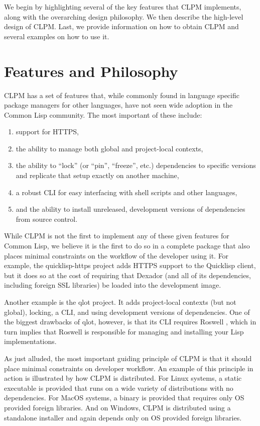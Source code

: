 \documentclass[sigconf]{acmart}
\begin{document}
We begin by highlighting several of the key features that CLPM implements,
along with the overarching design philosophy. We then describe the high-level
design of CLPM. Last, we provide information on how to obtain CLPM and several
examples on how to use it.

\section{Features and Philosophy}

CLPM has a set of features that, while commonly found in language specific
package managers for other languages, have not seen wide adoption in the Common
Lisp community. The most important of these include:

\begin{enumerate}
\item support for HTTPS,
\item the ability to manage both global and project-local contexts,
\item the ability to ``lock'' (or ``pin'', ``freeze'', etc.) dependencies to
  specific versions and replicate that setup exactly on another machine,
\item a robust CLI for easy interfacing with shell scripts and other languages,
\item and the ability to install unreleased, development versions of
  dependencies from source control.
\end{enumerate}

While CLPM is not the first to implement any of these given features for Common
Lisp, we believe it is the first to do so in a complete package that also
places minimal constraints on the workflow of the developer using it. For
example, the quicklisp-https \cite{quicklisp-https} project adds HTTPS support
to the Quicklisp client, but it does so at the cost of requiring that Dexador
\cite{dexador} (and all of its dependencies, including foreign SSL libraries)
be loaded into the development image.

Another example is the qlot \cite{qlot} project. It adds project-local contexts
(but not global), locking, a CLI, and using development versions of
dependencies. One of the biggest drawbacks of qlot, however, is that its CLI
requires Roswell \cite{roswell}, which in turn implies that Roswell is
responsible for managing and installing your Lisp implementations.

As just alluded, the most important guiding principle of CLPM is that it should
place minimal constraints on developer workflow. An example of this principle
in action is illustrated by how CLPM is distributed. For Linux systems, a
static executable is provided that runs on a wide variety of distributions with
no dependencies. For MacOS systems, a binary is provided that requires only OS
provided foreign libraries. And on Windows, CLPM is distributed using a
standalone installer and again depends only on OS provided foreign
libraries.
\end{document}
